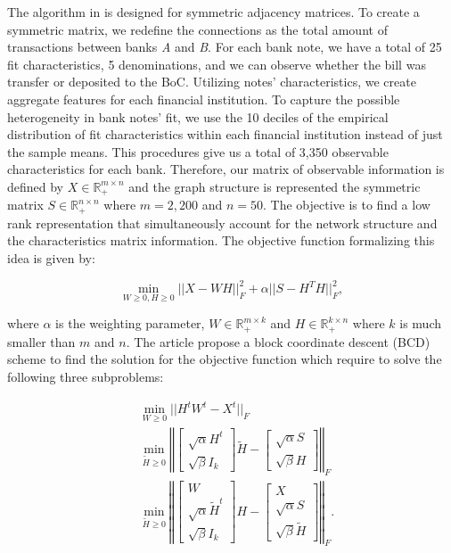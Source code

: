 \documentclass[11pt,letter]{article}%
\numberwithin{equation}{section}
\begin{document}
The algorithm in \cite{Du2017} is designed for symmetric adjacency matrices. To create a symmetric matrix, we redefine the connections as the total amount of transactions between banks \textit{A} and \textit{B}. For each bank note, we have a total of 25 fit characteristics, 5 denominations, and we can observe whether the bill was transfer or deposited to the BoC. Utilizing notes' characteristics, we create aggregate features for each financial institution. To capture the possible heterogeneity in bank notes' fit, we use the 10 deciles of the empirical distribution of fit characteristics within each financial institution instead of just the sample means. This procedures give us a total of 3,350 observable characteristics for each bank. Therefore, our matrix of observable information is defined by $X \in \mathbb{R}_{+}^{m \times n}$ and the graph structure is represented the symmetric matrix $S \in \mathbb{R}_{+}^{n \times n}$ where $m=2,200$ and $n=50$. The objective is to find a low rank representation that simultaneously account for the network structure and the characteristics matrix information. The objective function formalizing this idea is given by:

\begin{equation}
\min\limits_{W\geq 0,H \geq 0} ||X-WH||^{2}_{F}+\alpha||S-H^{T}H||^{2}_{F},
\label{e3}
\end{equation}

where $\alpha$ is the weighting parameter, $W \in \mathbb{R}_{+}^{m \times k}$ and $H \in \mathbb{R}_{+}^{k \times n}$ where $k$ is much smaller than $m$ and $n$. The article propose a block coordinate descent (BCD) scheme to find the solution for the objective function which require to solve the following three subproblems:

\begin{align}
\label{e4}
&\min\limits_{W\geq 0} ||H^{t}W^{t}-X^{t}||_{F} \\
\label{e5}
&\min\limits_{\tilde{H}\geq 0} \left\Vert \begin{bmatrix}\sqrt{\alpha}H^{t}  \\ \sqrt{\beta} I_k \end{bmatrix} \tilde{H} - \begin{bmatrix}\sqrt{\alpha}S  \\ \sqrt{\beta} H \end{bmatrix}\right\Vert_{F}\\
\label{e6}
&\min\limits_{\tilde{H}\geq 0} \left\Vert \begin{bmatrix} W \\ \sqrt{\alpha} \tilde{H}^{t} \\ \sqrt{\beta} I_k \end{bmatrix} H - \begin{bmatrix} X \\ \sqrt{\alpha} S \\ \sqrt{\beta} \tilde{H} \end{bmatrix}\right\Vert_{F}.\\
\end{align}
\end{document}
